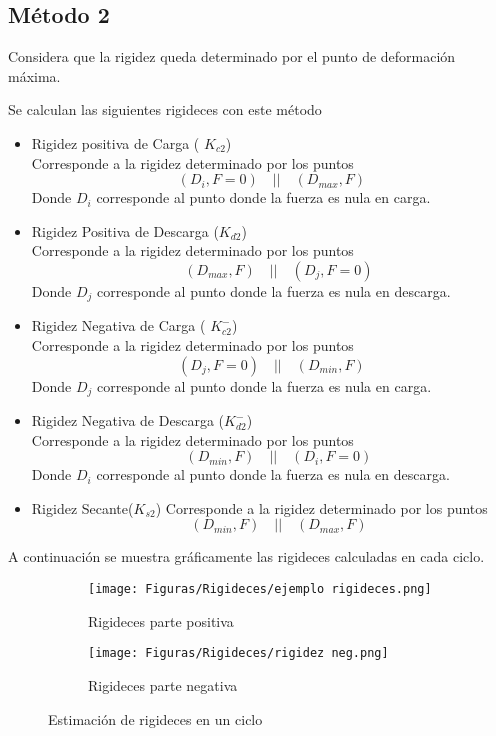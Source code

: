 \documentclass[a4paper, 11pt,article,oneside]{memoir}%
\begin{document}
\subsection{Método 2}\label{subsec: metodo 2}
Considera que la rigidez queda determinado por el punto de deformación máxima. \par 
Se calculan las siguientes rigideces con este método
\begin{itemize}
    \item Rigidez positiva de Carga ( $K_{c2}$)\\
    Corresponde a la rigidez determinado por los puntos
    $$ (D_i,F=0)\quad || \quad (D_{max},F)$$
    Donde $D_i$ corresponde al punto donde la fuerza es nula en carga.
    \item Rigidez Positiva de Descarga ($K_{d2}$)\\
     Corresponde a la rigidez determinado por los puntos
    $$ \quad (D_{max},F)\quad || \quad (D_j,F=0)$$
    Donde $D_j$ corresponde al punto donde la fuerza es nula en descarga.
    \item Rigidez Negativa de Carga ( $K^{-}_{c2}$)\\
    Corresponde a la rigidez determinado por los puntos
    $$ (D_j,F=0)\quad || \quad (D_{min},F)$$
    Donde $D_j$ corresponde al punto donde la fuerza es nula en carga.
     \item Rigidez Negativa de Descarga ($K^-_{d2}$)\\
     Corresponde a la rigidez determinado por los puntos
    $$ \quad (D_{min},F)\quad || \quad (D_i,F=0)$$
    Donde $D_i$ corresponde al punto donde la fuerza es nula en descarga.
    \item Rigidez Secante($K_{s2}$)
    Corresponde a la rigidez determinado por los puntos
    $$ \quad (D_{min},F)\quad || \quad (D_{max},F)$$
    \end{itemize}
 A continuación se muestra gráficamente las rigideces calculadas en cada ciclo.
    \begin{figure}[h!]
    \centering
    \begin{subfigure}{1\textwidth}
    \texttt{[image: Figuras/Rigideces/ejemplo rigideces.png]}
    \caption{Rigideces parte positiva}
    \label{fig:Rigidez positica}
\end{subfigure}
\hfill
\begin{subfigure}{1\textwidth}
    \texttt{[image: Figuras/Rigideces/rigidez neg.png]}
    \caption{Rigideces parte negativa}
    \label{fig:Rigidez negativa}
\end{subfigure}
\caption{Estimación de rigideces en un ciclo}
\label{fig:figures}
\end{figure}
\end{document}
